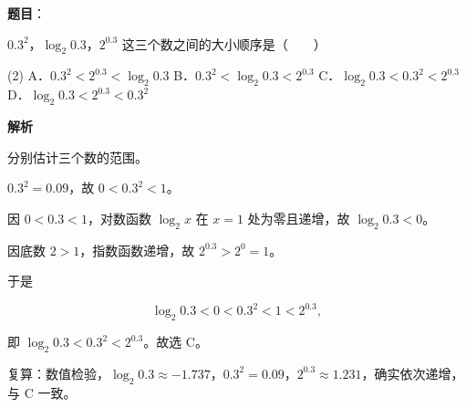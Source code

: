 \begin{answer}

\textbf{题目}：

$0.3^2$，$\log_2 0.3$，$2^{0.3}$ 这三个数之间的大小顺序是\mbox{（　　）}

\begin{gkopts}(2)
\task A．$0.3^2<2^{0.3}<\log_2 0.3$
\task B．$0.3^2<\log_2 0.3<2^{0.3}$
\task C．$\log_2 0.3<0.3^2<2^{0.3}$
\task D．$\log_2 0.3<2^{0.3}<0.3^2$
\end{gkopts}

\textbf{解析}

分别估计三个数的范围。

$0.3^2=0.09$，故 $0<0.3^2<1$。

因 $0<0.3<1$，对数函数 $\log_2 x$ 在 $x=1$ 处为零且递增，故 $\log_2 0.3<0$。

因底数 $2>1$，指数函数递增，故 $2^{0.3}>2^0=1$。

于是

\nopagebreak[4]
\[
\log_2 0.3<0<0.3^2<1<2^{0.3},
\]

即 $\log_2 0.3<0.3^2<2^{0.3}$。故选 C。

复算：数值检验，$\log_2 0.3\approx-1.737$，$0.3^2=0.09$，$2^{0.3}\approx1.231$，确实依次递增，与 C 一致。


\end{answer}
